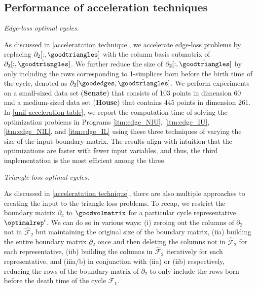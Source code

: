 
\subsection{Performance of acceleration techniques} \label{accelerateresults}

\emph{Edge-loss optimal cycles.} 

As discussed in \se \ref{acceleratation technique}, we accelerate edge-loss problems by replacing $\partial_2[:, \goodtriangles]$ with the column basis submatrix of $\partial_2[:, \hat \goodtriangles]$. We further reduce the size of $\partial_2[:, \hat \goodtriangles]$ by only including the rows corresponding to 1-simplices born before the birth time of the cycle, denoted as $\partial_2[\goodedges, \hat \goodtriangles]$. We perform experiments on a small-sized data set (\textbf{Senate}) that consists of 103 points in dimension $60$ and a medium-sized data set (\textbf{House}) that contains $445$ points in dimension $261$. In \tab
\ref{unif-acceleration-table}, we report the computation time of solving the optimization problems in Programs \ref{itm:edge_NIU}, \ref{itm:edge_IU}, \ref{itm:edge_NIL}, and \ref{itm:edge_IL} using these three techniques of varying the size of the input boundary matrix. The results align with intuition that the optimizations are faster with fewer input variables, and thus, the third implementation is the most efficient among the three.

\emph{Triangle-loss optimal cycles.}

As discussed in \se \ref{acceleratation technique}, there are also multiple approaches to creating the input to the triangle-loss problems. To recap, we restrict the boundary matrix $\partial_2$ to $\goodvolmatrix$ for a particular cycle representative $\optimalrep^i$. We can do so in various ways: (i) zeroing out the columns of $\partial_2$ not in $\hat{\mathcal{F}}_2$ but maintaining the original size of the boundary matrix, (iia) building the entire boundary matrix $\partial_2$ once and then deleting the columns not in $\hat{\mathcal{F}}_2$ for each representative, (iib) building the columns in $\hat{\mathcal{F}}_2$ iteratively for each representative, and (iiia/b) in conjunction with (iia) or (iib) respectively, reducing the rows of the boundary matrix of $\partial_2$ to only include the rows born before the death time of the cycle $\mathcal{F}_1$. 


